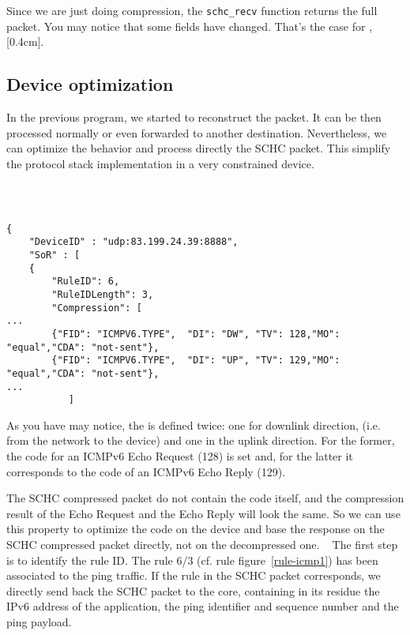 Since we are just doing compression, the \texttt{schc\_recv} function returns the full packet. You may notice that some fields have changed. That's the case for , [0.4cm]. 



\subsection{Device optimization}

In the previous program, we started to reconstruct the packet. It can be then processed normally or even forwarded to another destination. Nevertheless, we can optimize the behavior and process directly the SCHC packet. This simplify the protocol stack implementation in a very constrained device. 

~~

\begin{lstlisting}[basicstyle=\ttfamily\tiny, caption={extract from rule 6/3 for ping traffic}, backgroundcolor=\color{yellow}]

{
    "DeviceID" : "udp:83.199.24.39:8888",
    "SoR" : [
	{
	    "RuleID": 6,
	    "RuleIDLength": 3,
	    "Compression": [
...
		{"FID": "ICMPV6.TYPE",  "DI": "DW", "TV": 128,"MO": "equal","CDA": "not-sent"},
		{"FID": "ICMPV6.TYPE",  "DI": "UP", "TV": 129,"MO": "equal","CDA": "not-sent"},
...
	       ]

\end{lstlisting}
As you have may notice, the  is defined twice: one for downlink direction, (i.e. from the network to the device) and one in the uplink direction. For the former, the code for an ICMPv6 Echo Request (128) is set and, for the latter it corresponds to the code of an ICMPv6 Echo Reply (129).

The SCHC compressed packet do not contain the code itself, and the compression result of the Echo Request and the Echo Reply will look the same. So we can use this property to optimize the code on the device and base the response on the SCHC compressed packet directly, not on the decompressed one.
~
The first step is to identify the rule ID. The rule 6/3 (cf. rule figure~\vref{rule-icmp1}) has been associated to the ping traffic. If the rule in the SCHC packet corresponds, we directly send back the SCHC packet to the core, containing in its residue the IPv6 address of the application, the ping identifier and sequence number and the ping payload. 


